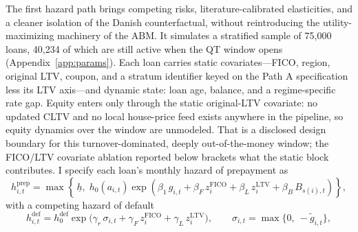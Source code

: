 \documentclass[12pt]{article}
\begin{document}
The first hazard path brings competing risks, literature-calibrated elasticities, and a cleaner isolation of the Danish counterfactual, without reintroducing the utility-maximizing machinery of the ABM. It simulates a stratified sample of 75,000 loans, 40,234 of which are still active when the QT window opens (Appendix~\ref{app:params}). Each loan carries static covariates---FICO, region, original LTV, coupon, and a stratum identifier keyed on the Path A specification less its LTV axis---and dynamic state: loan age, balance, and a regime-specific rate gap. Equity enters only through the static original-LTV covariate: no updated CLTV and no local house-price feed exists anywhere in the pipeline, so equity dynamics over the window are unmodeled. That is a disclosed design boundary for this turnover-dominated, deeply out-of-the-money window; the FICO/LTV covariate ablation reported below brackets what the static block contributes. I specify each loan's monthly hazard of prepayment as
\begin{equation}\label{eq:pathB}
h^{\mathrm{prep}}_{i,t} = \max\!\left\{\, \underline{h},\; h_0\!\left(a_{i,t}\right) \exp\!\left( \beta_1\, g_{i,t} + \beta_F\, z^{\mathrm{FICO}}_{i} + \beta_L\, z^{\mathrm{LTV}}_{i} + \beta_B\, B_{s(i),t} \right) \right\},
\end{equation}
with a competing hazard of default
\begin{equation}\label{eq:default}
h^{\mathrm{def}}_{i,t} = h^{\mathrm{def}}_0 \exp\!\big( \gamma_r\, \sigma_{i,t} + \gamma_F\, z^{\mathrm{FICO}}_{i} + \gamma_L\, z^{\mathrm{LTV}}_{i} \big), \qquad \sigma_{i,t} = \max\{0,\ -\tilde g_{i,t}\},
\end{equation}
\end{document}
